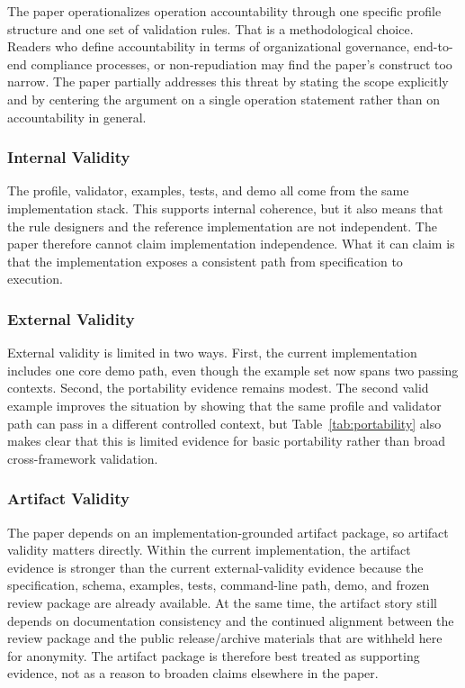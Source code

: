 The paper operationalizes operation accountability through one specific profile structure and one set of validation rules. That is a methodological choice. Readers who define accountability in terms of organizational governance, end-to-end compliance processes, or non-repudiation may find the paper's construct too narrow. The paper partially addresses this threat by stating the scope explicitly and by centering the argument on a single operation statement rather than on accountability in general.

\subsubsection{Internal Validity}

The profile, validator, examples, tests, and demo all come from the same implementation stack. This supports internal coherence, but it also means that the rule designers and the reference implementation are not independent. The paper therefore cannot claim implementation independence. What it can claim is that the implementation exposes a consistent path from specification to execution.

\subsubsection{External Validity}

External validity is limited in two ways. First, the current implementation includes one core demo path, even though the example set now spans two passing contexts. Second, the portability evidence remains modest. The second valid example improves the situation by showing that the same profile and validator path can pass in a different controlled context, but Table~\ref{tab:portability} also makes clear that this is limited evidence for basic portability rather than broad cross-framework validation.

\subsubsection{Artifact Validity}

The paper depends on an implementation-grounded artifact package, so artifact validity matters directly. Within the current implementation, the artifact evidence is stronger than the current external-validity evidence because the specification, schema, examples, tests, command-line path, demo, and frozen review package are already available. At the same time, the artifact story still depends on documentation consistency and the continued alignment between the review package and the public release/archive materials that are withheld here for anonymity. The artifact package is therefore best treated as supporting evidence, not as a reason to broaden claims elsewhere in the paper.

